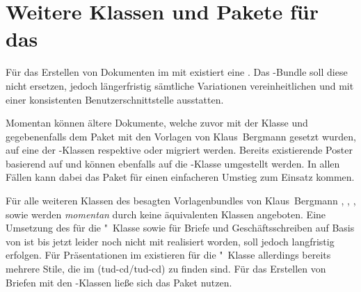 \section{%
  Weitere Klassen und Pakete für das \CD%
  \label{sec:tudclasses}%
}
%
Für das Erstellen von Dokumenten im \TUDCD mit  existiert eine 
. Das 
\TUDScript-Bundle soll diese nicht ersetzen, jedoch längerfristig sämtliche 
Variationen vereinheitlichen und mit einer konsistenten Benutzerschnittstelle 
ausstatten. 

Momentan können ältere Dokumente, welche zuvor mit der Klasse 
 und gegebenenfalls dem Paket 
 mit den Vorlagen von Klaus~Bergmann 
gesetzt wurden, auf eine der \TUDScript-Klassen  respektive 
 oder  migriert werden. Bereits 
existierende Poster basierend auf  und 
 können ebenfalls auf die 
\TUDScript-Klasse  umgestellt werden. In allen Fällen kann 
dabei das Paket  für einen einfacheren Umstieg zum Einsatz 
kommen. 

Für alle weiteren Klassen des besagten Vorlagenbundles von Klaus~Bergmann
, ,
,  sowie
 werden \emph{momentan} durch \TUDScript
keine äquivalenten Klassen angeboten.
%
Eine Umsetzung des \CDs für die "~Klasse sowie für Briefe und 
Geschäftsschreiben auf Basis von \KOMAScript ist bis jetzt leider noch nicht 
mit \TUDScript realisiert worden, soll jedoch langfristig erfolgen. Für 
Präsentationen im \TUDCD existieren für die "~Klasse allerdings 
bereits mehrere Stile, die im \GitHubRepo(tud-cd/tud-cd) zu finden sind. 
Für das Erstellen von Briefen mit den \TUDScript-Klassen ließe sich das Paket 
 nutzen.



